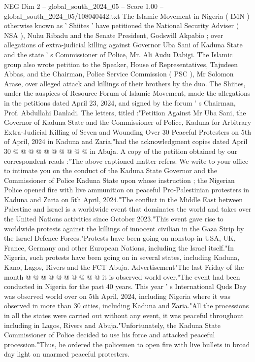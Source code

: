 \begin{textsample}{NEG Dim 2 – global\_south\_2024\_05 – Score 1.00 – global\_south\_2024\_05/108040442.txt}  \label{ex:f2_neg_221}
The Islamic Movement in Nigeria ( IMN ) otherwise known as ' Shiites ' have petitioned the National Security Adviser ( NSA ), Nuhu Ribadu and the Senate President, Godswill Akpabio ; over allegations of extra-judicial killing against Governor Uba Sani of Kaduna State and the state ' s Commissioner of Police, Mr.
Ali Audu Dabigi.
The Islamic group also wrote petition to the Speaker, House of Representatives, Tajudeen Abbas, and the Chairman, Police Service Commission ( PSC ), Mr Solomon Arase, over alleged attack and killings of their brothers by the duo.
The Shiites, under the auspices of Resource Forum of Islamic Movement, made the allegations in the petitions dated April 23, 2024, and signed by the forum ' s Chairman, Prof.
Abdullahi Danladi.
The letters, titled :"Petition Against Mr Uba Sani, the Governor of Kaduna State and the Commissioner of Police, Kaduna for Arbitrary Extra-Judicial Killing of Seven and Wounding Over 30 Peaceful Protesters on 5th of April, 2024 in Kaduna and Zaria,"had the acknowledgment copies dated April 30 @ @ @ @ @ @ @ @ @ @ in Abuja.
A copy of the petition obtained by our correspondent reads :"The above-captioned matter refers.
We write to your office to intimate you on the conduct of the Kaduna State Governor and the Commissioner of Police Kaduna State upon whose instruction ; the Nigerian Police opened fire with live ammunition on peaceful Pro-Palestinian protesters in Kaduna and Zaria on 5th April, 2024."The conflict in the Middle East between Palestine and Israel is a worldwide event that dominates the world and takes over the United Nations activities since October 2023."This event gave rise to worldwide protests against the killings of innocent civilian in the Gaza Strip by the Israel Defence Forces."Protests have been going on nonstop in USA, UK, France, Germany and other European Nations, including the Israel itself."In Nigeria, such protests have been going on in several states, including Kaduna, Kano, Lagos, Rivers and the FCT Abuja.
Advertisement"The last Friday of the month @ @ @ @ @ @ @ @ @ @ it is observed world over."The event had been conducted in Nigeria for the past 40 years.
This year ' s International Quds Day was observed world over on 5th April, 2024, including Nigeria where it was observed in more than 30 cities, including Kaduna and Zaria."All the processions in all the states were carried out without any event, it was peaceful throughout including in Lagos, Rivers and Abuja."Unfortunately, the Kaduna State Commissioner of Police decided to use his force and attacked peaceful procession."Thus, he ordered the policemen to open fire with live bullets in broad day light on unarmed peaceful protesters.

\end{textsample}
